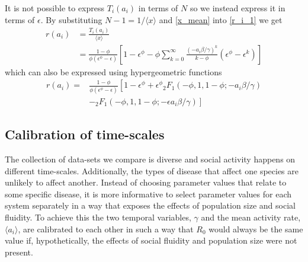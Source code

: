 \documentclass[twocolumn,8pt]{article}
\begin{document}
It is not possible to express $T_{i}(a_{i})$ in terms of $N$ so we instead express it in terms of $\epsilon$. By substituting $N-1=1/\langle x \rangle$ and \eqref{x_mean} into \eqref{r_i_1} we get
\begin{equation}
\label{r_i}
\begin{split}
r(a_{i})&=\frac{T_{i}(a_{i})}{\langle x \rangle}\\[10pt]
&=\frac{1-\phi}{\phi(\epsilon^{\phi}-\epsilon)}\left[1-\epsilon^{\phi}-\phi\sum_{k=0}^{\infty}\frac{(-a_{i}\beta/\gamma)^{k}}{k-\phi}(\epsilon^{\phi}-\epsilon^{k})\right]
\end{split}
\end{equation}
which can also be expressed using hypergeometric functions
\begin{equation}
\label{with_N}
\begin{split}
r(a_{i})=&\frac{1-\phi}{\phi(\epsilon^{\phi}-\epsilon)}\left[1-\epsilon^{\phi}+\epsilon^{\phi}{}_{2}F_{1}(-\phi,1,1-\phi;-a_{i}\beta/\gamma)\right.\\[10pt]
&\left.-{}_{2}F_{1}(-\phi,1,1-\phi;-\epsilon a_{i}\beta/\gamma)\right]
\end{split}
\end{equation}
\subsection{Calibration of time-scales}
The collection of data-sets we compare is diverse and social activity happens on different time-scales. Additionally, the types of disease that affect one species are unlikely to affect another. Instead of choosing parameter values that relate to some specific disease, it is more informative to select parameter values for each system separately in a way that exposes the effects of population size and social fluidity. To achieve this the two temporal variables, $\gamma$ and the mean activity rate, $\langle a_{i}\rangle$, are calibrated to each other in such a way that $R_{0}$ would always be the same value if, hypothetically, the effects of social fluidity and population size were not present.
\end{document}
